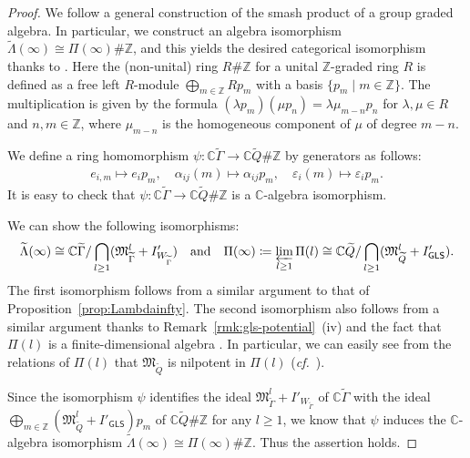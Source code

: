 \documentclass[12pt]{amsart}
\theoremstyle{definition}
\theoremstyle{remark}
\numberwithin{equation}{section}
\newcommand{\confer}{\textit{cf.}\ }
\newcommand{\fM}{\mathfrak{M}}
\begin{document}
\begin{proof}
    We follow a general construction \cite{CM84,Bea88} of the smash product of a group graded algebra. In particular, we construct an algebra isomorphism $\widetilde{\Lambda}(\infty)\cong \Pi(\infty)\#\mathbb{Z}$, and this yields the desired categorical isomorphism thanks to \cite[\S 2, Theorem~2.6]{Bea88}. Here the (non-unital) ring $R\# \mathbb{Z}$ for a unital $\mathbb{Z}$-graded ring $R$ is defined as a free left $R$-module $\bigoplus_{m \in \mathbb{Z}} R p_m$ with a basis $\{p_m \mid m \in \mathbb{Z}\}$. The multiplication is given by the formula $(\lambda p_m)(\mu p_n) = \lambda \mu_{m-n}p_n$ for $\lambda, \mu \in R$ and $n,m \in \mathbb{Z}$, where $\mu_{m-n}$ is the homogeneous component of $\mu$ of degree $m-n$.

 We define a ring homomorphism $\psi\colon \mathbb{C}\widetilde{\Gamma} \to \mathbb{C}\widetilde{Q}\#\mathbb{Z}$ by generators as follows:
\begin{align*}
e_{i,m} \mapsto e_i p_m, \quad
\alpha_{ij}(m) \mapsto \alpha_{ij} p_m, \quad
\varepsilon_i(m) \mapsto \varepsilon_i p_m.
\end{align*}
It is easy to check that $\psi\colon \mathbb{C}\widetilde{\Gamma} \to \mathbb{C}\widetilde{Q}\#\mathbb{Z}$ is a $\mathbb C$-algebra isomorphism. 

We can show the following isomorphisms:
\[
   \widetilde \Lambda(\infty)  \cong \mathbb{C} \widetilde \Gamma/ \bigcap_{l\geq 1}(\mathfrak{M}_{\widetilde \Gamma}^l+I'_{W_{\widetilde \Gamma}})\quad\text{and}\quad
   \Pi(\infty)\coloneqq \varprojlim_{l\geq 1} \Pi(l)\cong \mathbb{C}\widetilde{Q}/\bigcap_{l\geq 1}(\mathfrak{M}_{\widetilde{Q}}^l+I'_{\mathsf{GLS}}).
\]
The first isomorphism follows from a similar argument to that of Proposition~\ref{prop:Lambdainfty}.
The second isomorphism also follows from a similar argument thanks to Remark~\ref{rmk:gls-potential}~(iv) and the fact that $\Pi(l)$ is a finite-dimensional algebra \cite[Corollary~11.13]{GLS-2017}. In particular, we can easily see from the relations of $\Pi(l)$ that $\fM_{\widetilde{Q}}$ is nilpotent in $\Pi(l)$  (\confer \cite[Theorem~2.2~(2)]{FM}).

Since the isomorphism $\psi$ identifies the ideal $\mathfrak{M}_{\widetilde \Gamma}^l+I'_{W_{\widetilde \Gamma}}$ of
$\mathbb{C} \widetilde \Gamma$ with the ideal $\bigoplus_{m\in\mathbb Z}(\mathfrak{M}_{\widetilde{Q}}^l+I'_{\mathsf{GLS}})p_m$ of $\mathbb{C}\widetilde{Q}\#\mathbb{Z}$ for any $l\geq 1$, we know that  $\psi$ induces the $\mathbb C$-algebra isomorphism $\widetilde{\Lambda}(\infty)\cong \Pi(\infty)\#\mathbb{Z}$. Thus the assertion holds.
\end{proof}
\end{document}
